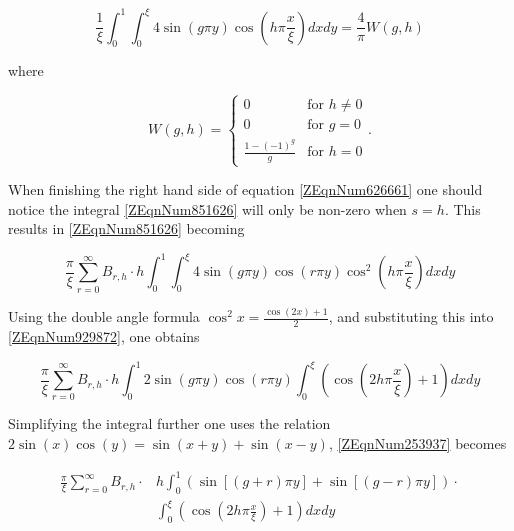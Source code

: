\documentclass{article}
\newcommand{\ctfunc}[7]{
    #1 = 
    \begin{cases} 
        #2 & #3 \\
        #4 & #5 \\
        #6 & #7
    \end{cases}
}
\begin{document}
\begin{equation} \label{ZEqnNum309765} 
    \frac{1}{\xi } \int _{0}^{1} \int _{0}^{\xi } 4 \sin \left(g\pi y\right) 
    \cos \left(h\pi \frac{x}{\xi } \right)dxdy
    =\frac{4}{\pi } W\left(g,h\right) 
\end{equation}

where

\begin{equation}\label{3.13} 
    \ctfunc{W\left(g,h\right)}
    {0}{\text{for } h \ne 0}
    {0}{\text{for } g = 0}
    {\frac{1 - \left(-1 \right)^{g}}{g}}{\text{for } h = 0}. 
\end{equation}

When finishing the right hand side of equation \eqref{ZEqnNum626661} one should
notice the integral \eqref{ZEqnNum851626} will only be non-zero when $s=h$. This
results in \eqref{ZEqnNum851626} becoming

\begin{equation} \label{ZEqnNum929872} 
    \frac{\pi }{\xi } \sum _{r=0}^{\infty} B_{r,h} \cdot 
    h\int _{0}^{1} \int _{0}^{\xi} 4\sin \left(g\pi y\right)
    \cos (r \pi y)\cos ^{2} \left(h\pi \frac{x}{\xi } \right) dxdy 
\end{equation}

Using the double angle formula $\cos ^{2} x=\frac{\cos \left(2x\right)+1}{2} $,
and substituting this into \eqref{ZEqnNum929872}, one obtains

\begin{equation} \label{ZEqnNum253937} 
    \frac{\pi }{\xi } \sum _{r=0}^{\infty} B_{r,h} \cdot 
    h \int _{0}^{1}2\sin \left(g\pi y\right)\cos (r\pi y) 
    \int_{0}^{\xi } \left(\cos \left(2h\pi \frac{x}{\xi } \right) + 1 \right) dxdy
\end{equation}

Simplifying the integral further one uses the relation $2\sin \left(x\right)\cos
\left(y\right)=\sin \left(x+y\right)+\sin \left(x-y\right)$,
\eqref{ZEqnNum253937} becomes

\begin{equation} \label{ZEqnNum322465} \begin{split}
    \frac{\pi }{\xi } \sum _{r=0}^{\infty} B_{r,h} \cdot 
    & h\int _{0}^{1} \left( \sin \left[ \left( g + r \right) \pi y \right] + 
    \sin \left[ \left(g - r\right) \pi y \right] \right) \cdot \\
    & \int _{0}^{\xi} \left(\cos \left(2h\pi \frac{x}{\xi} \right) + 1\right) dxdy 
\end{split} \end{equation} 
\end{document}
